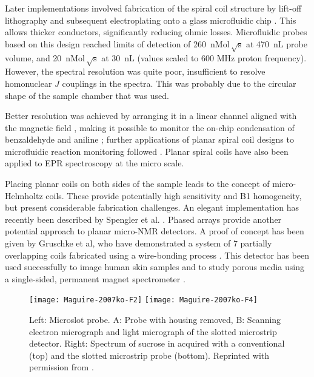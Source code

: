 Later implementations involved
fabrication of the spiral coil structure by lift-off lithography and
subsequent electroplating onto a glass microfluidic chip
\cite{Massin:2002bj}. This allows thicker conductors, significantly
reducing ohmic losses. Microfluidic probes based on this design
\cite{massin2003pmb} reached limits of detection of 260~$\mathrm{nMol\,\sqrt{s}}$ 
at 470~nL probe volume, and 20~$\mathrm{nMol\,\sqrt{s}}$ at 30~nL (values
scaled to 600 MHz proton frequency). However, the spectral resolution
was quite poor, insufficient to resolve homonuclear $J$ couplings in the
 spectra. This was probably due to the circular shape
of the sample chamber that was used.

 Better resolution was achieved
by arranging it in a linear channel aligned with the magnetic field
\cite{Wensink:2004kd}, making it possible to monitor the on-chip
condensation of benzaldehyde and aniline \cite{wensink2005mrk}; further
applications of planar spiral coil designs to microfluidic reaction
monitoring followed \cite{Gomez:2010jr,Yue:2012fw}. Planar spiral coils
have also been applied to EPR spectroscopy \cite{Boero:2003hf} at the micro
scale.

Placing planar coils on both sides of the sample leads to the
concept of micro-Helmholtz coils. These provide potentially high
sensitivity and B1 homogeneity, but present considerable fabrication
challenges. An elegant implementation has recently been described by
Spengler et al. \cite{Spengler:2014ir,Spengler:2016km}. Phased arrays
provide another potential approach to planar micro-NMR detectors. A
proof of concept has been given by Gruschke et al, who have demonstrated
a system of 7 partially overlapping coils fabricated using a
wire-bonding process \cite{Gruschke:2012df}. This detector has been used
successfully to image human skin samples \cite{Gobel:2014tf} and to study
porous media using a single-sided, permanent magnet spectrometer
\cite{Oligschlager:2015fl}.

\begin{figure}
	\begin{center}
		\texttt{[image: Maguire-2007ko-F2]}
		\texttt{[image: Maguire-2007ko-F4]}
	\end{center}
	\caption{Left: Microslot probe. A: Probe with housing removed, B: Scanning electron micrograph and light micrograph of the slotted microstrip detector. Right: Spectrum of sucrose in  acquired with a conventional (top) and the slotted microstrip probe (bottom).  Reprinted with permission from \cite{Maguire:2007ko}.}
	\label{fig-Maguire-2007ko}
\end{figure}


